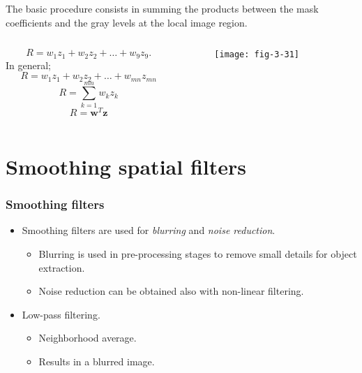\begin{frame}
The basic procedure consists in summing the products between the mask coefficients and the gray levels at the local image region.
\begin{columns}
\begin{column}{.5\textwidth}
\[
R = w_{1} z_{1} + w_{2} z_{2} + \ldots + w_{9} z_{9}.
\]
In general;
\[
R = w_{1} z_{1} + w_{2} z_{2} + \ldots + w_{mn} z_{mn}
\]
\[
R = \sum_{k=1}^{mn}w_{k}z_{k}
\]
\begin{equation}
R = \textbf{w}^{T} \textbf{z}
\end{equation}
\end{column}
\begin{column}{.5\textwidth}
\begin{figure}
\centering
\texttt{[image: fig-3-31]}
\end{figure}
\end{column}
\end{columns}
\end{frame}


\section{Smoothing spatial filters}


\begin{frame}
\frametitle{Smoothing filters}
\begin{itemize}
\item Smoothing filters are used for \textit{blurring} and \textit{noise reduction}.
\begin{itemize}
\item Blurring is used in pre-processing stages to remove small details for object extraction.
\item Noise reduction can be obtained also with non-linear filtering.
\end{itemize}
\item Low-pass filtering.
\begin{itemize}
\item Neighborhood average.
\item Results in a blurred image.
\end{itemize}
\end{itemize}
\end{frame}


